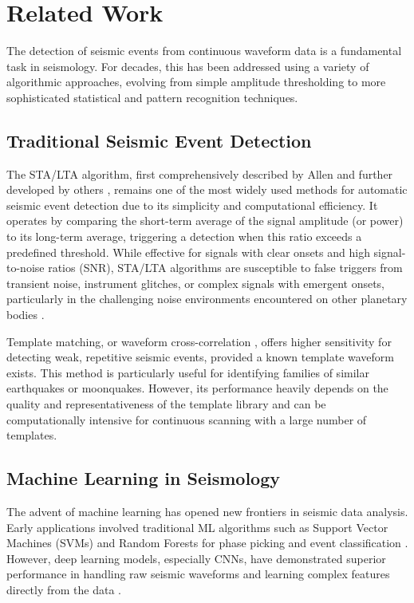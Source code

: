 \documentclass[conference]{IEEEtran}
\begin{document}
        \section{Related Work}
\label{sec:related_work}
The detection of seismic events from continuous waveform data is a fundamental task in seismology. For decades, this has been addressed using a variety of algorithmic approaches, evolving from simple amplitude thresholding to more sophisticated statistical and pattern recognition techniques.

\subsection{Traditional Seismic Event Detection}
The STA/LTA algorithm, first comprehensively described by Allen \cite{b14} and further developed by others \cite{b26}, remains one of the most widely used methods for automatic seismic event detection due to its simplicity and computational efficiency. It operates by comparing the short-term average of the signal amplitude (or power) to its long-term average, triggering a detection when this ratio exceeds a predefined threshold. While effective for signals with clear onsets and high signal-to-noise ratios (SNR), STA/LTA algorithms are susceptible to false triggers from transient noise, instrument glitches, or complex signals with emergent onsets, particularly in the challenging noise environments encountered on other planetary bodies \cite{b15}.

Template matching, or waveform cross-correlation \cite{b18}, offers higher sensitivity for detecting weak, repetitive seismic events, provided a known template waveform exists. This method is particularly useful for identifying families of similar earthquakes or moonquakes. However, its performance heavily depends on the quality and representativeness of the template library and can be computationally intensive for continuous scanning with a large number of templates.

\subsection{Machine Learning in Seismology}
The advent of machine learning has opened new frontiers in seismic data analysis. Early applications involved traditional ML algorithms such as Support Vector Machines (SVMs) and Random Forests for phase picking and event classification \cite{b19}. However, deep learning models, especially CNNs, have demonstrated superior performance in handling raw seismic waveforms and learning complex features directly from the data \cite{b16}.
\end{document}
